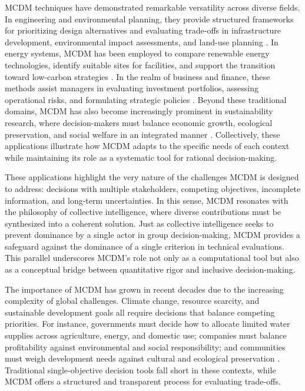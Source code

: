 MCDM techniques have demonstrated remarkable versatility across diverse fields. In engineering and environmental planning, they provide structured frameworks for prioritizing design alternatives and evaluating trade-offs in infrastructure development, environmental impact assessments, and land-use planning \cite{karakus2022,Dirie2024}. In energy systems, MCDM has been employed to compare renewable energy technologies, identify suitable sites for facilities, and support the transition toward low-carbon strategies \cite{POHEKAR2004}. In the realm of business and finance, these methods assist managers in evaluating investment portfolios, assessing operational risks, and formulating strategic policies \cite{TAMIZ1998}. Beyond these traditional domains, MCDM has also become increasingly prominent in sustainability research, where decision-makers must balance economic growth, ecological preservation, and social welfare in an integrated manner \cite{ettazarini2021,Mardani2015}. Collectively, these applications illustrate how MCDM adapts to the specific needs of each context while maintaining its role as a systematic tool for rational decision-making.

These applications highlight the very nature of the challenges MCDM is designed to address: decisions with multiple stakeholders, competing objectives, incomplete information, and long-term uncertainties. In this sense, MCDM resonates with the philosophy of collective intelligence, where diverse contributions must be synthesized into a coherent solution\cite{Cinalli2015}. Just as collective intelligence seeks to prevent dominance by a single actor in group decision-making, MCDM provides a safeguard against the dominance of a single criterion in technical evaluations. This parallel underscores MCDM’s role not only as a computational tool but also as a conceptual bridge between quantitative rigor and inclusive decision-making.   

The importance of MCDM has grown in recent decades due to the increasing complexity of global challenges. Climate change, resource scarcity, and sustainable development goals all require decisions that balance competing priorities. For instance, governments must decide how to allocate limited water supplies across agriculture, energy, and domestic use; companies must balance profitability against environmental and social responsibility; and communities must weigh development needs against cultural and ecological preservation \cite{KUMAR2017596,PortnerIPCC2022}. Traditional single-objective decision tools fall short in these contexts, while MCDM offers a structured and transparent process for evaluating trade-offs.

